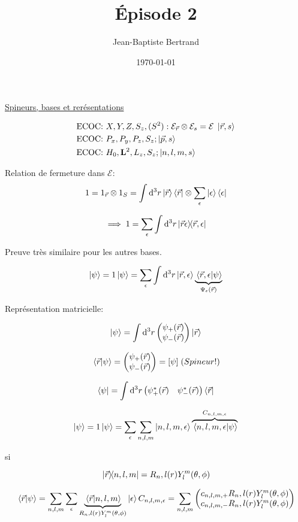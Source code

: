 \documentclass{article}
\title{Épisode 2}
\author{Jean-Baptiste Bertrand}
\date{\today}
\begin{document}
\maketitle

\underline{Spineurs, bases et rerésentations}

\begin{align}
	&\text{ECOC: } X, Y, Z, S_z, (S^2): \mathcal{E}_{\vec r}\otimes \mathcal{E}_s=\mathcal{E}\; \ket{\vec r, s}\\
	&\text{ECOC: } P_x, P_y, P_z, S_z; \ket{\vec p, s}\\
	&\text{ECOC: } H_0, \vb L^2, L_z, S_z ; \ket{n,l,m,s}
\end{align}

Relation de fermeture dans $\mathcal{E}:$ $$1 = 1_{\vec r} \otimes 1_S = \int \dd^3 r \ket{\vec r}\bra{\vec r} \otimes \sum_\epsilon \ket{\epsilon}\bra{\epsilon}$$

$$\implies 1 = \sum_\epsilon\int\dd^3r \ketbra*{\vec r\epsilon}{\vec r, \epsilon}$$

Preuve très similaire pour les autres bases.

$$\ket\psi = 1 \ket \psi = \sum_\epsilon \int \dd^3r \ket{\vec r, \epsilon} \underbrace{\braket*{\vec r, \epsilon}{\psi}}_{\Psi_\epsilon(\vec r)}$$

Représentation matricielle:

$$
	\ket\psi = \int \dd^3 r \begin{pmatrix}
		\psi_+(\vec r)\\
		\psi_-(\vec r)
	\end{pmatrix}\ket{\vec r}
$$

$$\braket*{\vec r}{\psi} = \begin{pmatrix}
	\psi_+(\vec r)\\
	\psi_-(\vec r) 
\end{pmatrix} = [\psi] \; \text(Spineur!)$$ 

$$
	\bra\psi = \int \dd^3 r \begin{pmatrix}
		\psi^*_+(\vec r) &
		\psi^*_-(\vec r)
	\end{pmatrix}\bra{\vec r}
$$


\begin{equation}
	\ket\psi = 1\ket\psi = \sum_\epsilon\sum_{n,l,m} \ket{n,l,m,\epsilon}\overbrace{\braket*{n,l,m,\epsilon}{\psi}}^{C_{n,l,m,\epsilon}}
\end{equation}

si

$$\ketbra*{\vec r}{n,l,m} = R_n,l(r)Y_l^m(\theta,\phi)$$

$$\braket*{\vec r}{\psi} = \sum_{n,l,m}\sum_\epsilon \underbrace{\braket*{\vec r}{n,l,m}}_{R_n,l(r)Y_l^m(\theta,\phi)}\ket\epsilon C_{n,l,m,\epsilon} = \sum_{n,l,m}\begin{pmatrix}
	c_{n,l,m,+}R_n,l(r)Y_l^m(\theta,\phi)\\
	c_{n,l,m,-}R_n,l(r)Y_l^m(\theta,\phi)
\end{pmatrix}$$
\end{document}
